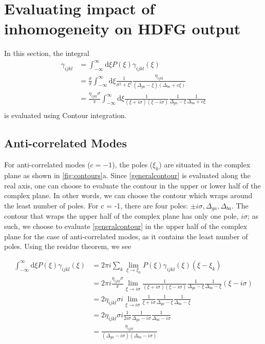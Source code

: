 \documentclass[aip, jcp, reprint, onecolumn, nofootinbib]{revtex4-2}
\begin{document}
\section{Evaluating impact of inhomogeneity on HDFG output}
In this section, the integral
\begin{equation}\label{generalcontour}
	\begin{split}
		\gamma_{ijkl} &= \int_{-\infty}^\infty \mathrm{d}\xi P(\xi) \gamma_{ijkl}(\xi)\\
		&= \frac{\sigma}{\pi}\int_{-\infty}^\infty \mathrm{d}\xi \frac{1}{\sigma^2 + \xi^2} \frac{\eta_{ijkl}}{\left(\Delta_{ga} - \xi\right)\left(\Delta_{ba}+ c\xi\right)} \\
		&= \frac{\eta_{ijkl} \sigma}{\pi} \int_{-\infty}^\infty \mathrm{d}\xi\frac{1}{(\xi + i\sigma)(\xi - i\sigma)} \frac{1}{\Delta_{ga} - \xi} \frac{1}{\Delta_{ba} + c\xi}\\
	\end{split}
\end{equation}
is evaluated using Contour integration.

\subsection{Anti-correlated Modes}
For anti-correlated modes ($c = -1$), the poles ($\xi_k$) are situated in the complex plane as shown in \autoref{fig:contours}a.
Since \autoref{generalcontour} is evaluated along the real axis, one can choose to evaluate the contour in the upper or lower half of the complex plane.
In other words, we can choose the contour which wraps around the least number of poles.
For c = -1, there are four poles: $\pm i \sigma, \Delta_{ga}, \Delta_{ba}$. 
The contour that wraps the upper half of the complex plane has only one pole, $i \sigma$; as such, we choose to evaluate \autoref{generalcontour} in the upper half of the complex plane for the case of anti-correlated modes, as it contains the least number of poles.
Using the residue theorem, we see
\begin{widetext}
	\begin{equation}
		\begin{split}
			\int_{-\infty}^\infty \mathrm{d}\xi P(\xi) \gamma_{ijkl}(\xi) &= 2\pi i \sum_k \lim_{\xi \rightarrow \xi_k} P(\xi) \gamma_{ijkl}(\xi) (\xi - \xi_k)\\
			&= 2\pi i \frac{\eta_{ijkl} \sigma}{\pi} \lim_{\xi \rightarrow i\sigma} \frac{1}{(\xi + i\sigma)(\xi - i\sigma)} \frac{1}{\Delta_{ga} - \xi} \frac{1}{\Delta_{ba} - \xi} (\xi - i \sigma)\\
			&= 2 \eta_{ijkl} \sigma i \lim_{\xi \rightarrow i\sigma} \frac{1}{\xi + i\sigma} \frac{1}{\Delta_{ga} - \xi} \frac{1}{\Delta_{ba} - \xi}\\
			&= 2\eta_{ijkl} \sigma i \frac{1}{2i\sigma} \frac{1}{\Delta_{ga} - i\sigma} \frac{1}{\Delta_{ba} - i\sigma}\\
			&= \frac{\eta_{ijkl}}{\left(\Delta_{ga}-i\sigma\right)\left(\Delta_{ba}-i \sigma\right)}\\
		\end{split}
	\end{equation}
\end{widetext}
\end{document}
